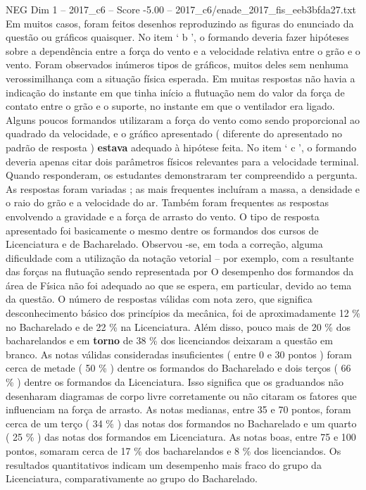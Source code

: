 \begin{textsample}{NEG Dim 1 – 2017\_c6 – Score -5.00 – 2017\_c6/enade\_2017\_fis\_eeb3bfda27.txt}
Em muitos casos, foram feitos desenhos reproduzindo as figuras do enunciado da questão ou gráficos quaisquer.
No item ‘ b ’, o formando deveria fazer hipóteses sobre a dependência entre a força do vento e a velocidade relativa entre o grão e o vento.
Foram observados inúmeros tipos de gráficos, muitos deles sem nenhuma verossimilhança com a situação física esperada.
Em muitas respostas não havia a indicação do instante em que tinha início a flutuação nem do valor da força de contato entre o grão e o suporte, no instante em que o ventilador era ligado.
Alguns poucos formandos utilizaram a força do vento como sendo proporcional ao quadrado da velocidade, e o gráfico apresentado ( diferente do apresentado no padrão de resposta ) \textbf{estava} adequado à hipótese feita.
No item ‘ c ’, o formando deveria apenas citar dois parâmetros físicos relevantes para a velocidade terminal.
Quando responderam, os estudantes demonstraram ter compreendido a pergunta.
As respostas foram variadas ; as mais frequentes incluíram a massa, a densidade e o raio do grão e a velocidade do ar.
Também foram frequentes as respostas envolvendo a gravidade e a força de arrasto do vento.
O tipo de resposta apresentado foi basicamente o mesmo dentre os formandos dos cursos de Licenciatura e de Bacharelado.
Observou -se, em toda a correção, alguma dificuldade com a utilização da notação vetorial – por exemplo, com a resultante das forças na flutuação sendo representada por O desempenho dos formandos da área de Física não foi adequado ao que se espera, em particular, devido ao tema da questão.
O número de respostas válidas com nota zero, que significa desconhecimento básico dos princípios da mecânica, foi de aproximadamente 12 \% no Bacharelado e de 22 \% na Licenciatura.
Além disso, pouco mais de 20 \% dos bacharelandos e em \textbf{torno} de 38 \% dos licenciandos deixaram a questão em branco.
As notas válidas consideradas insuficientes ( entre 0 e 30 pontos ) foram cerca de metade ( 50 \% ) dentre os formandos do Bacharelado e dois terços ( 66 \% ) dentre os formandos da Licenciatura.
Isso significa que os graduandos não desenharam diagramas de corpo livre corretamente ou não citaram os fatores que influenciam na força de arrasto.
As notas medianas, entre 35 e 70 pontos, foram cerca de um terço ( 34 \% ) das notas dos formandos no Bacharelado e um quarto ( 25 \% ) das notas dos formandos em Licenciatura.
As notas boas, entre 75 e 100 pontos, somaram cerca de 17 \% dos bacharelandos e 8 \% dos licenciandos.
Os resultados quantitativos indicam um desempenho mais fraco do grupo da Licenciatura, comparativamente ao grupo do Bacharelado.

\end{textsample}
